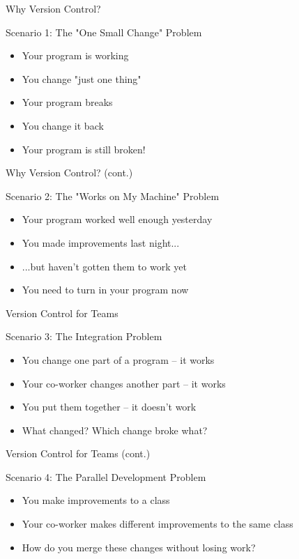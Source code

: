 \documentclass[aspectratio=169]{beamer}
\begin{document}
\begin{frame}{Why Version Control?}
\begin{block}{Scenario 1: The "One Small Change" Problem}
\begin{itemize}
  \item Your program is working
  \item You change "just one thing"
  \item Your program breaks
  \item You change it back
  \item Your program is still broken!
\end{itemize}
\end{block}
\end{frame}

\begin{frame}{Why Version Control? (cont.)}
\begin{block}{Scenario 2: The "Works on My Machine" Problem}
\begin{itemize}
  \item Your program worked well enough yesterday
  \item You made improvements last night...
  \item ...but haven't gotten them to work yet
  \item You need to turn in your program now
\end{itemize}
\end{block}
\end{frame}

\begin{frame}{Version Control for Teams}
\begin{block}{Scenario 3: The Integration Problem}
\begin{itemize}
  \item You change one part of a program -- it works
  \item Your co-worker changes another part -- it works
  \item You put them together -- it doesn't work
  \item What changed? Which change broke what?
\end{itemize}
\end{block}
\end{frame}

\begin{frame}{Version Control for Teams (cont.)}
\begin{block}{Scenario 4: The Parallel Development Problem}
\begin{itemize}
  \item You make improvements to a class
  \item Your co-worker makes different improvements to the same class
  \item How do you merge these changes without losing work?
\end{itemize}
\end{block}
\end{frame}
\end{document}
